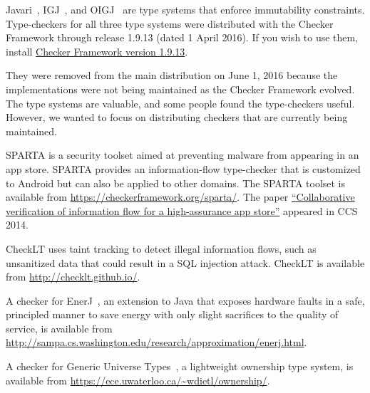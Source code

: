 
Javari~\cite{TschantzE2005}, IGJ~\cite{ZibinPAAKE2007}, and
OIGJ~\cite{ZibinPLAE2010} are type systems that enforce immutability
constraints.  Type-checkers for all three type systems were distributed
with the Checker Framework through release 1.9.13 (dated 1 April 2016).
If you wish to use them, install
\href{https://checkerframework.org/releases/1.9.13/}{Checker
  Framework version 1.9.13}.

They were removed from the main distribution on June 1, 2016 because the
implementations were not being maintained as the Checker Framework evolved.
The type systems are valuable, and some people found the type-checkers
useful.  However,
we wanted
to focus on distributing checkers that are currently being maintained.



SPARTA is a security toolset aimed at preventing malware from appearing in
an app store.  SPARTA provides an information-flow type-checker that is
customized to Android but can also be applied to other domains.
The SPARTA toolset is available from
\url{https://checkerframework.org/sparta/}.
The paper
\href{https://homes.cs.washington.edu/~mernst/pubs/infoflow-ccs2014.pdf}{``Collaborative
    verification of information flow for a high-assurance app store''}
  appeared in CCS 2014.



CheckLT uses taint tracking to detect illegal information flows, such as
unsanitized data that could result in a SQL injection attack.
CheckLT is available from \url{http://checklt.github.io/}.



A checker for EnerJ~\cite{SampsonDFGCG2011}, an extension to Java that exposes hardware faults
in a safe, principled manner to save energy with only
slight sacrifices to the quality of service, is available from
\url{http://sampa.cs.washington.edu/research/approximation/enerj.html}.



A checker for Generic Universe Types~\cite{DietlEM2011}, a lightweight ownership type
system, is available from
\url{https://ece.uwaterloo.ca/~wdietl/ownership/}.



